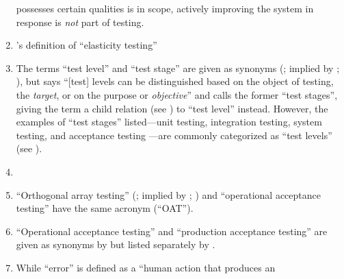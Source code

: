 \begin{enumerate}
          possesses certain qualities is in scope, actively improving the
          system in response is \emph{not} part of testing.
    \item %
          \citet[p.~5\=/9]{SWEBOK2024}'s definition of
          ``elasticity testing'' \swebokElasRef{}
    \item %
          The terms ``test level'' and ``test stage'' are given as synonyms
          (\citealpISTQB{}; implied by \citealp[p.~9]{IEEE2015};
          \citealp[p.~9]{Gerrard2000a}), but
          \citet[p.~5\=/6]{SWEBOK2025} says ``[test] levels can be distinguished
          based on the object of testing, the \emph{target}, or on the purpose
          or \emph{objective}'' and calls the former ``test stages'', giving
          the term a child relation (see ) to ``test level''
          instead. However, the examples of ``test stages'' listed---unit
          testing, integration testing, system testing, and acceptance testing
          \citep[pp.~5\=/6 to 5\=/7]{SWEBOK2025}---are commonly categorized as
          ``test levels'' (see ).
    \item %
          \tolTestFlaw{}
    \item %
          ``Orthogonal array testing'' (\citealp[pp.~5\=/1, 5\=/11]{SWEBOK2025};
          implied by \citealp[pp.~467, 473]{Valcheva2013};
          \citealp[pp.~1573\==1577, 1580]{YuEtAl2011}) and ``operational
          acceptance testing'' \citep[p.~30]{Firesmith2015} have the same
          acronym (``OAT'').
    \item %
          ``Operational acceptance testing'' and ``production acceptance
          testing'' are given as synonyms by \citetISTQB{} but listed
          separately by \citet[p.~30]{Firesmith2015}.
    \item %
          While ``error'' is defined as a ``human action that produces an

\end{enumerate}
